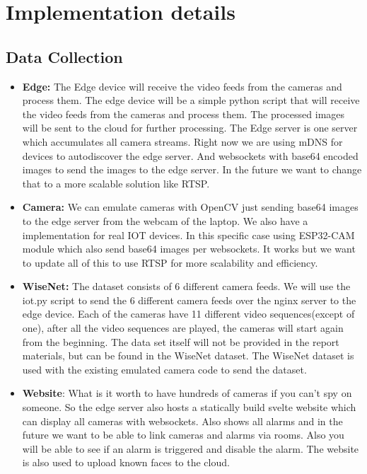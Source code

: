\documentclass[conference]{IEEEtran}
\begin{document}
\section{Implementation details}
\subsection{Data Collection}
\begin{itemize}
      \item \textbf{Edge:} The Edge device will receive the video feeds from the cameras and process them. The edge device will be a simple python script that will receive the video feeds from the cameras
            and process them. The processed images will be sent to the cloud for further processing.
            The Edge server is one server which accumulates all camera streams. Right now we are using mDNS for devices to autodiscover the edge server. And websockets with base64 encoded images to send the images to the edge server.
            In the future we want to change that to a more scalable solution like RTSP.
      \item \textbf{Camera:} We can emulate cameras with OpenCV just sending base64 images to the edge server from the webcam of the laptop. We also have a implementation for real IOT devices.
            In this specific case using ESP32-CAM module which also send base64 images per websockets. It works but we want to update all of this to use RTSP for more scalability and efficiency.
      \item \textbf{WiseNet:} The dataset consists of 6 different camera feeds. We will use the iot.py script to send the 6 different camera feeds over the nginx server to the edge device.
            Each of the cameras have 11 different video sequences(except of one), after all the video sequences are played, the cameras will start again from the beginning.
            The data set itself will not be provided in the report materials, but can be found in the WiseNet dataset.
            The WiseNet dataset is used with the existing emulated camera code to send the dataset.
      \item \textbf{Website}: What is it worth to have hundreds of cameras if you can't spy on someone.
            So the edge server also hosts a statically build svelte website which can display all cameras with websockets.
            Also shows all alarms and in the future we want to be able to link cameras and alarms via rooms. Also you will be able to see if an alarm is triggered and disable the alarm.
            The website is also used to upload known faces to the cloud.
\end{itemize}
\end{document}
